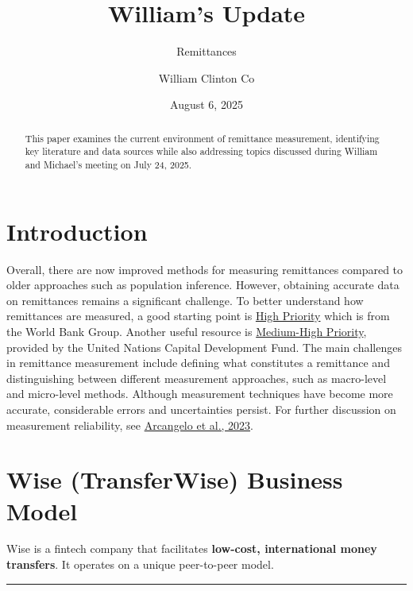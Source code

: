 \documentclass[
  11pt,
]{article}
\title{William's Update}
\subtitle{Remittances}
\author{William Clinton Co}
\date{August 6, 2025}
\renewcommand*\contentsname{Table of contents}
\newcommand\contentsname{Table of contents}
\begin{document}
\maketitle
\begin{abstract}
This paper examines the current environment of remittance measurement,
identifying key literature and data sources while also addressing topics
discussed during William and Michael's meeting on July 24, 2025.
\end{abstract}

\renewcommand*\contentsname{Table of contents}
{
\hypersetup{linkcolor=}
\setcounter{tocdepth}{3}
\tableofcontents
}

\section{Introduction}\label{introduction}

Overall, there are now improved methods for measuring remittances
compared to older approaches such as population inference. However,
obtaining accurate data on remittances remains a significant challenge.
To better understand how remittances are measured, a good starting point
is \hyperref[high-priority]{High Priority} which is from the World Bank
Group. Another useful resource is
\hyperref[medium-high-priority]{Medium-High Priority}, provided by the
United Nations Capital Development Fund. The main challenges in
remittance measurement include defining what constitutes a remittance
and distinguishing between different measurement approaches, such as
macro-level and micro-level methods. Although measurement techniques
have become more accurate, considerable errors and uncertainties
persist. For further discussion on measurement reliability, see
\href{https://drive.google.com/file/d/1pAtaJZZPiYqQxYHhQaiGtDIG2D1GC0vw/view?usp=sharing}{Arcangelo
et al., 2023}.

\section{Wise (TransferWise) Business
Model}\label{wise-transferwise-business-model}

Wise is a fintech company that facilitates \textbf{low-cost,
international money transfers}. It operates on a unique peer-to-peer
model.

\begin{center}\rule{0.5\linewidth}{0.5pt}\end{center}
\end{document}
